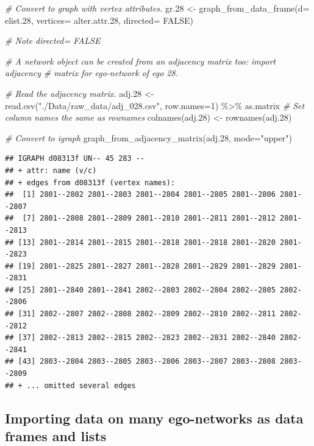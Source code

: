 \documentclass[
]{book}
\newenvironment{Shaded}{\begin{snugshade}}{\end{snugshade}}
\newcommand{\AttributeTok}[1]{\textcolor[rgb]{0.77,0.63,0.00}{#1}}
\newcommand{\CommentTok}[1]{\textcolor[rgb]{0.56,0.35,0.01}{\textit{#1}}}
\newcommand{\ConstantTok}[1]{\textcolor[rgb]{0.00,0.00,0.00}{#1}}
\newcommand{\DecValTok}[1]{\textcolor[rgb]{0.00,0.00,0.81}{#1}}
\newcommand{\FloatTok}[1]{\textcolor[rgb]{0.00,0.00,0.81}{#1}}
\newcommand{\FunctionTok}[1]{\textcolor[rgb]{0.00,0.00,0.00}{#1}}
\newcommand{\NormalTok}[1]{#1}
\newcommand{\OtherTok}[1]{\textcolor[rgb]{0.56,0.35,0.01}{#1}}
\newcommand{\SpecialCharTok}[1]{\textcolor[rgb]{0.00,0.00,0.00}{#1}}
\newcommand{\StringTok}[1]{\textcolor[rgb]{0.31,0.60,0.02}{#1}}
\begin{document}
\begin{Shaded}
\begin{Highlighting}[]
\CommentTok{\# Convert to graph with vertex attributes.}
\NormalTok{gr}\FloatTok{.28} \OtherTok{\textless{}{-}} \FunctionTok{graph\_from\_data\_frame}\NormalTok{(}\AttributeTok{d=}\NormalTok{ elist}\FloatTok{.28}\NormalTok{, }\AttributeTok{vertices=}\NormalTok{ alter.attr}\FloatTok{.28}\NormalTok{, }\AttributeTok{directed=} \ConstantTok{FALSE}\NormalTok{)}

\CommentTok{\# Note directed= FALSE}

\CommentTok{\# A network object can be created from an adjacency matrix too: import adjacency}
\CommentTok{\# matrix for ego{-}network of ego 28.}

\CommentTok{\# Read the adjacency matrix.}
\NormalTok{adj}\FloatTok{.28} \OtherTok{\textless{}{-}} \FunctionTok{read.csv}\NormalTok{(}\StringTok{"./Data/raw\_data/adj\_028.csv"}\NormalTok{, }\AttributeTok{row.names=}\DecValTok{1}\NormalTok{) }\SpecialCharTok{\%\textgreater{}\%} 
\NormalTok{  as.matrix}
\CommentTok{\# Set column names the same as rownames}
\FunctionTok{colnames}\NormalTok{(adj}\FloatTok{.28}\NormalTok{) }\OtherTok{\textless{}{-}} \FunctionTok{rownames}\NormalTok{(adj}\FloatTok{.28}\NormalTok{)}

\CommentTok{\# Convert to igraph}
\FunctionTok{graph\_from\_adjacency\_matrix}\NormalTok{(adj}\FloatTok{.28}\NormalTok{, }\AttributeTok{mode=}\StringTok{"upper"}\NormalTok{)}
\end{Highlighting}
\end{Shaded}

\begin{verbatim}
## IGRAPH d08313f UN-- 45 283 -- 
## + attr: name (v/c)
## + edges from d08313f (vertex names):
##  [1] 2801--2802 2801--2803 2801--2804 2801--2805 2801--2806 2801--2807
##  [7] 2801--2808 2801--2809 2801--2810 2801--2811 2801--2812 2801--2813
## [13] 2801--2814 2801--2815 2801--2818 2801--2818 2801--2820 2801--2823
## [19] 2801--2825 2801--2827 2801--2828 2801--2829 2801--2829 2801--2831
## [25] 2801--2840 2801--2841 2802--2803 2802--2804 2802--2805 2802--2806
## [31] 2802--2807 2802--2808 2802--2809 2802--2810 2802--2811 2802--2812
## [37] 2802--2813 2802--2815 2802--2823 2802--2831 2802--2840 2802--2841
## [43] 2803--2804 2803--2805 2803--2806 2803--2807 2803--2808 2803--2809
## + ... omitted several edges
\end{verbatim}

\hypertarget{importing-data-on-many-ego-networks-as-data-frames-and-lists}{%
\subsection{Importing data on many ego-networks as data frames and lists}\label{importing-data-on-many-ego-networks-as-data-frames-and-lists}}
\end{document}
